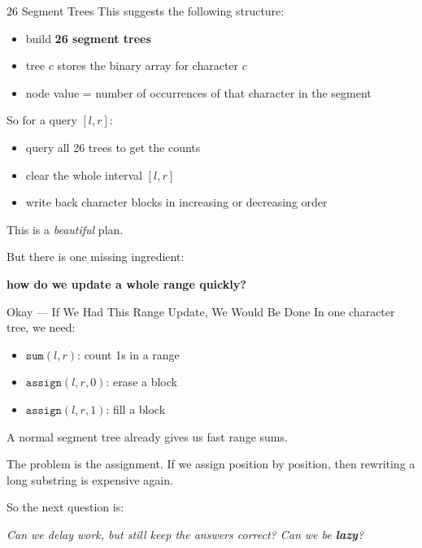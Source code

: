 \documentclass[aspectratio=169]{beamer}
\begin{document}
\begin{frame}{26 Segment Trees}
    This suggests the following structure:
    \begin{itemize}
        \item build \textbf{26 segment trees}
        \item tree \(c\) stores the binary array for character \(c\)
        \item node value = number of occurrences of that character in the
        segment
    \end{itemize}

    So for a query \([l,r]\):
    \begin{itemize}
        \item query all 26 trees to get the counts
        \item clear the whole interval \([l,r]\)
        \item write back character blocks in increasing or decreasing order
    \end{itemize}

    This is a \textit{beautiful} plan.

    But there is one missing ingredient:
    \begin{center}
        \textbf{how do we update a whole range quickly?}
    \end{center}
\end{frame}

\begin{frame}{Okay --- If We Had This Range Update, We Would Be Done}
    In one character tree, we need:
    \begin{itemize}
        \item \(\texttt{sum}(l,r)\): count 1s in a range
        \item \(\texttt{assign}(l,r,0)\): erase a block
        \item \(\texttt{assign}(l,r,1)\): fill a block
    \end{itemize}

    A normal segment tree already gives us fast range sums.

    The problem is the assignment.
    If we assign position by position, then rewriting a long substring is
    expensive again.

    So the next question is:
    \begin{center}
        \textit{Can we delay work, but still keep the answers correct? Can we be \textbf{lazy}?}
    \end{center}
\end{frame}
\end{document}
